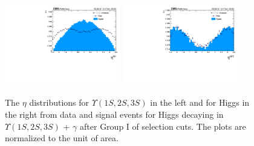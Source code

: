 \begin{figure}[!htbp]
\begin{center}
\includegraphics[width=0.45\textwidth]{figures/outputPlots/HtoUpsilon_Cat0_ZZZZZ/au/data_x_mc/noKinCuts/h_noKin_Upsilon_eta}\hspace*{1.cm}
\includegraphics[width=0.45\textwidth]{figures/outputPlots/HtoUpsilon_Cat0_ZZZZZ/au/data_x_mc/noKinCuts/h_noKin_Z_eta}
\end{center}\vspace*{-.5cm}
\caption{The $\eta$ distributions for $\Upsilon(1S,2S,3S)$ in the left and for Higgs in the right from data and signal events for Higgs decaying in $\Upsilon(1S,2S,3S)$ + $\gamma$ after Group I of selection cuts. The plots are normalized to the unit of area.}
\label{fig:etaUpsilon_and_Higgs_HtoUpsilon_Cat0}
\end{figure}

